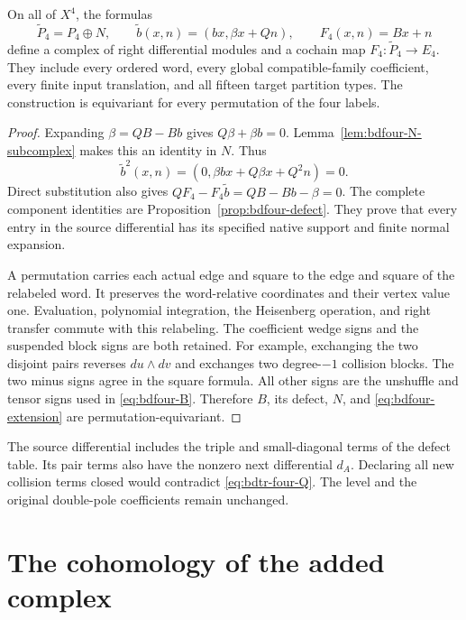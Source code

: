 \begin{theorem}\label{thm:bdfour-comparison}
On all of $X^4$, the formulas
\begin{equation}\label{eq:bdfour-extension}
 \widetilde P_4=P_4\oplus N,\qquad
 \widetilde b(x,n)=(bx,\beta x+Qn),\qquad
 F_4(x,n)=Bx+n
\end{equation}
define a complex of right differential modules and a cochain map $F_4:\widetilde P_4\to E_4$.
They include every ordered word, every global compatible-family coefficient, every finite input translation, and all fifteen target partition types.
The construction is equivariant for every permutation of the four labels.
\end{theorem}
\begin{proof}
Expanding $\beta=QB-Bb$ gives $Q\beta+\beta b=0$.
Lemma~\ref{lem:bdfour-N-subcomplex} makes this an identity in $N$.
Thus
\[
 \widetilde b^2(x,n)=(0,\beta bx+Q\beta x+Q^2n)=0.
\]
Direct substitution also gives
$QF_4-F_4\widetilde b=QB-Bb-\beta=0$.
The complete component identities are Proposition~\ref{prop:bdfour-defect}.
They prove that every entry in the source differential has its specified native support and finite normal expansion.

A permutation carries each actual edge and square to the edge and square of the relabeled word.
It preserves the word-relative coordinates and their vertex value one.
Evaluation, polynomial integration, the Heisenberg operation, and right transfer commute with this relabeling.
The coefficient wedge signs and the suspended block signs are both retained.
For example, exchanging the two disjoint pairs reverses $du\wedge dv$ and exchanges two degree-$-1$ collision blocks.
The two minus signs agree in the square formula.
All other signs are the unshuffle and tensor signs used in \eqref{eq:bdfour-B}.
Therefore $B$, its defect, $N$, and \eqref{eq:bdfour-extension} are permutation-equivariant.
\end{proof}

The source differential includes the triple and small-diagonal terms of the defect table.
Its pair terms also have the nonzero next differential $d_A$.
Declaring all new collision terms closed would contradict \eqref{eq:bdtr-four-Q}.
The level and the original double-pole coefficients remain unchanged.

\section{The cohomology of the added complex}

